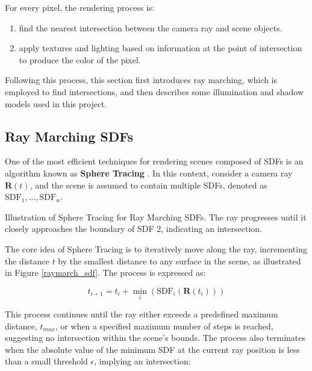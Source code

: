 For every pixel, the rendering process is:
\begin{enumerate}
    \item find the nearest intersection between the camera ray and scene objects.
    \item apply textures and lighting based on information at the point of intersection to produce the color of the pixel.
\end{enumerate}

Following this process, this section first introduces ray marching, which is employed to find intersections, and then describes some illumination and shadow models used in this project.

\subsection{Ray Marching SDFs}
\label{Raymarching SDFs}

One of the most efficient techniques for rendering scenes composed of SDFs is an algorithm known as \textbf{Sphere Tracing} \cite{hart_sphere_1995}. In this context, consider a camera ray $\mathbf{R}(t)$, and the scene is assumed to contain multiple SDFs, denoted as $\text{SDF}_1, \dots, \text{SDF}_n$.

{Illustration of Sphere Tracing for Ray Marching SDFs. 
The ray progresses until it closely approaches the boundary of SDF 2, indicating an intersection. }{}

The core idea of Sphere Tracing is to iteratively move along the ray, incrementing the distance $t$ by the smallest distance to any surface in the scene, as illustrated in Figure \ref{raymarch_sdf}. The process is expressed as:

\begin{equation}
    t_{i+1} = t_{i} + \min_i(\text{SDF}_i(\mathbf{R}(t_i)))
\end{equation}

This process continues until the ray either exceeds a predefined maximum distance, $t_{max}$, or when a specified maximum number of steps is reached, suggesting no intersection within the scene's bounds. The process also terminates when the absolute value of the minimum SDF at the current ray position is less than a small threshold $\epsilon$, implying an intersection:

